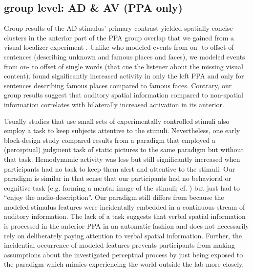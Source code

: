\documentclass[english]{article}
\begin{document}


\subsection{group level: AD \& AV (PPA only)}


Group results of the AD stimulus' primary contrast yielded spatially concise
clusters in the anterior part of the PPA group overlap that we gained from a
visual localizer experiment \citep{sengupta2016extension}.
Unlike \citep{aziz2008modulation} who modeled events from on- to offset of
sentences (describing unknown and famous places and faces), we modeled events
from on- to offset of single words (that cue the listener about the missing
visual content).
\citep{aziz2008modulation} found significantly increased activity in only the
left PPA and only for sentences describing famous places compared to famous
faces. Contrary, our group results suggest that auditory spatial information
compared to non-spatial information correlates with bilaterally increased
activation in its anterior.

Usually studies that use small sets of experimentally controlled stimuli also
employ a task to keep subjects attentive to the stimuli.
Nevertheless, one early block-design study \citep{epstein1998ppa} compared
results from a paradigm that employed a (perceptual) judgment task of static
pictures to the same paradigm but without that task.
Hemodynamic activity was less but still significantly increased when
participants had no task to keep them alert and attentive to the stimuli.
Our paradigm is similar in that sense that our participants had no behavioral or
cognitive task (e.g. forming a mental image of the stimuli; cf.
\citep{ocraven2000mental})  but just had to ``enjoy the audio-description''.
Our paradigm still differs from \citep{epstein1998ppa} because the modeled
stimulus features were incidentally embedded in a continuous stream of auditory
information.
The lack of a task suggests that verbal spatial information is processed in the
anterior PPA in an automatic fashion and does not necessarily rely on
deliberately paying attention to verbal spatial information.
%
Further, the incidential occurrence of modeled features prevents participants
from making assumptions about the investigated perceptual process by just being
exposed to the paradigm which mimics experiencing the world outside the lab more
closely.
\end{document}
